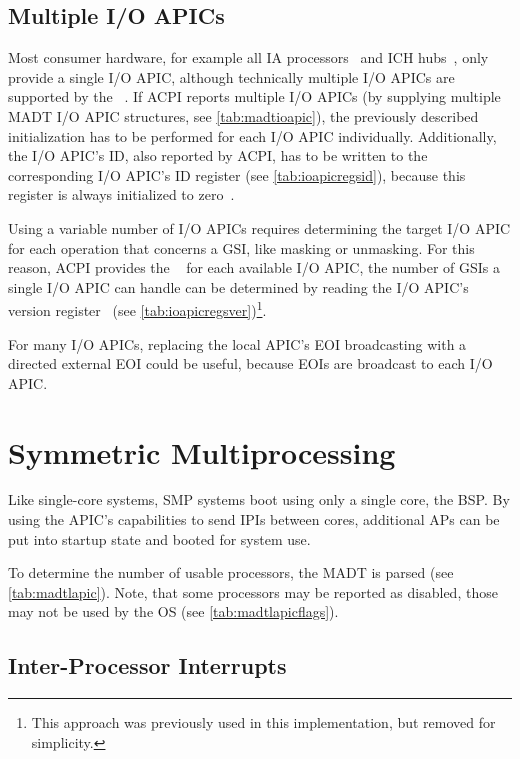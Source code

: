 \subsection{Multiple I/O APICs}
\label{subsec:multiioapic}

Most consumer hardware, for example all IA processors~\autocite{ia32} and ICH hubs~\autocite{ich5}, only provide a single I/O APIC, although technically multiple I/O APICs are supported by the ~\autocite[sec.~3.6.8]{mpspec}.
If ACPI reports multiple I/O APICs (by supplying multiple MADT I/O APIC structures, see \autoref{tab:madtioapic}), the previously described initialization has to be performed for each I/O APIC individually.
Additionally, the I/O APIC's ID, also reported by ACPI, has to be written to the corresponding I/O APIC's ID register (see \autoref{tab:ioapicregsid}), because this register is always initialized to zero~\autocite[sec.~9.5.6]{ich5}.

Using a variable number of I/O APICs requires determining the target I/O APIC for each operation that concerns a GSI, like masking or unmasking.
For this reason, ACPI provides the ~\autocite[sec.~5.2.8.2]{acpi1} for each available I/O APIC, the number of GSIs a single I/O APIC can handle can be determined by reading the I/O APIC's version register~\autocite[sec.~9.5.7]{ich5} (see \autoref{tab:ioapicregsver})\footnote{
  This approach was previously used in this implementation, but removed for simplicity.}.

For many I/O APICs, replacing the local APIC's EOI broadcasting with a directed external EOI could be useful, because EOIs are broadcast to each I/O APIC\@.

\section{Symmetric Multiprocessing}
\label{sec:smpinit}

Like single-core systems, SMP systems boot using only a single core, the BSP\@.
By using the APIC's capabilities to send IPIs between cores, additional APs can be put into startup state and booted for system use.

To determine the number of usable processors, the MADT is parsed (see \autoref{tab:madtlapic}).
Note, that some processors may be reported as disabled, those may not be used by the OS (see \autoref{tab:madtlapicflags}).

\subsection{Inter-Processor Interrupts}
\label{subsec:ipis}

